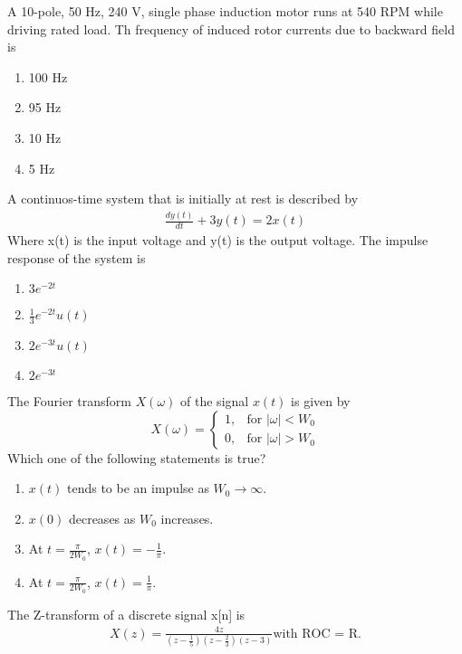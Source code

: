 \bigskip
\item A 10-pole, 50 Hz, 240 V, single phase induction motor runs at 540 RPM while driving rated load. Th frequency of induced rotor currents due to backward field is 
\begin{multicols}{2}
    \begin{enumerate}
        \item 100 Hz
        \item  95 Hz
        \item 10 Hz
        \item 5 Hz
    \end{enumerate}
\end{multicols}
\bigskip
\item A continuos-time system that is initially at rest is described by 
\begin{align*}
    \frac{dy(t)}{dt}+3y(t)=2x(t)
\end{align*}
Where x(t) is the input voltage and y(t) is the output voltage. The impulse response of the system is 
\begin{enumerate}
        \item $3e^{-2t}$
        \item $\frac{1}{3}e^{-2t}u(t)$
        \item $2e^{-3t}u(t)$
        \item $2e^{-3t}$
\end{enumerate}
\bigskip
\item The Fourier transform $X(\omega)$ of the signal $x(t)$ is given by
\[
X(\omega) =
\begin{cases}
1, & \text{for } |\omega| < W_0 \\
0, & \text{for } |\omega| > W_0
\end{cases}
\]
Which one of the following statements is true?
\begin{enumerate}
    \item $x(t)$ tends to be an impulse as $W_0 \to \infty$.
    \item $x(0)$ decreases as $W_0$ increases.
    \item At $t = \frac{\pi}{2W_0}$, $x(t) = -\frac{1}{\pi}$.
    \item At $t = \frac{\pi}{2W_0}$, $x(t) = \frac{1}{\pi}$.
\end{enumerate}
\bigskip
\item The Z-transform of a discrete signal x[n] is 
\begin{align*}
    X(z)=\frac{4z}{(z-\frac{1}{5})(z-\frac{2}{3})(z-3)} \text{with ROC = R.}
\end{align*}
